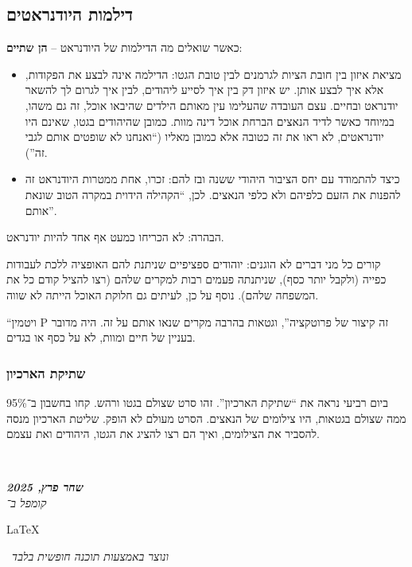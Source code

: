 \documentclass[]{article}
\newcommand\en[1] {\begin{otherlanguage}{english}#1\end{otherlanguage}}
\newcommand\ndoc  {\dotfill \\ \vfil {\begin{center}
            {\textbf{\textit{שחר פרץ, 2025}} \\
                \scriptsize \textit{קומפל ב־}\en{\LaTeX}\,\textit{ ונוצר באמצעות תוכנה חופשית בלבד}}
    \end{center}} \vfil	}
\begin{document}
    \subsection*{דילמות היודנראטים}
    
    כאשר שואלים מה הדילמות של היודנראט – \textbf{הן שתיים}: 
    \begin{itemize}
        \item מציאת איזון בין חובת הציות לגרמנים לבין טובת הגטו: הדילמה אינה לבצע את הפקודות, אלא איך לבצע אותן. יש איזון דק בין איך לסייע ליהודים, לבין איך לגרום לך להשאר יודנראט ובחיים. עצם העובדה שהעלימו עין מאותם הילדים שהיבאו אוכל, זה גם משהו, במיוחד כאשר לדיד הנאצים הברחת אוכל דינה מוות. כמובן שהיהודים בגטו, שאינם היו יודנראטים, לא ראו את זה כטובה אלא כמובן מאליו (``ואנחנו לא שופטים אותם לגבי זה''). 
        \item כיצד להתמודד עם יחס הציבור היהודי ששנה ובז להם: זכרו, אחת ממטרות היודנראט זה להפנות את הזעם כלפיהם ולא כלפי הנאצים. לכן, ``הקהילה הידוית במקרה הטוב שונאת אותם''. 
    \end{itemize}
    הבהרה: לא הכריחו כמעט אף אחד להיות יודנראט. 
    
    קורים כל מני דברים לא הוגנים: יוהודים ספציפיים שניתנת להם האופציה ללכת לעבודות כפייה (ולקבל יותר כסף), שניתנתה פעמים רבות למקרים שלהם (רצו להציל קודם כל את המשפחה שלהם). נוסף על כן, לעיתים גם חלוקת האוכל הייתה לא שווה. 
    
    ``ויטמין P זה קיצור של פרוטקציה'', וגטאות בהרבה מקרים שנאו אותם על זה. היה מדובר בעניין של חיים ומוות, לא על כסף או בגדים. 
    
    \subsubsection{שתיקת הארכיון}
    
    ביום רביעי נראה את ``שתיקת הארכיון''. זהו סרט שצולם בגטו ורהש. קחו בחשבון ב־95\% ממה שצולם בגטאות, היו צילומים של הנאצים. הסרט מעולם לא הופק. שליטת הארכיון מנסה להסביר את הצילומים, ואיך הם רצו להציג את הגטו, היהודים ואת עצמם. 
    
    
    
    
    \ndoc
\end{document}
